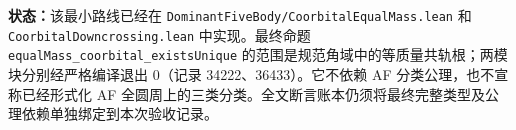 \documentclass[UTF8,fontset=fandol]{ctexart}
\begin{document}
\textbf{状态：}该最小路线已经在 \texttt{DominantFiveBody/CoorbitalEqualMass.lean} 和 \texttt{CoorbitalDowncrossing.lean} 中实现。最终命题 \texttt{equalMass\_coorbital\_existsUnique} 的范围是规范角域中的等质量共轨根；两模块分别经严格编译退出 0（记录 34222、36433）。它不依赖 AF 分类公理，也不宣称已经形式化 AF 全圆周上的三类分类。全文断言账本仍须将最终完整类型及公理依赖单独绑定到本次验收记录。
\end{document}
